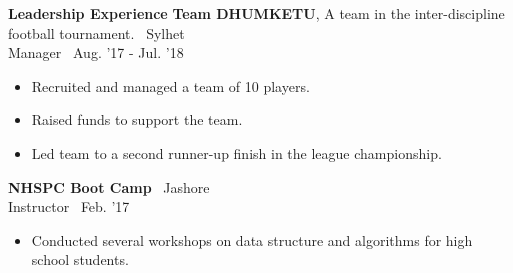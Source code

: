 \begin{rSection}{\textbf{Leadership Experience}}
{\bf Team DHUMKETU}{, A team in the inter-discipline football tournament.} \hfill {\ {Sylhet}}\\
Manager \hfill {\ Aug. '17 - Jul. '18} 
\begin{itemize}
  \item \vspace{-0.5em} Recruited and managed a team of 10 players.
  \vspace{-0.3em}
\end{itemize} 
\begin{itemize}
  \item \vspace{-0.5em} Raised funds to support the team.
  \vspace{-0.3em}
\end{itemize} 
\begin{itemize}
  \item \vspace{-0.5em} Led team to a second runner-up finish in the league championship.
  \vspace{-0.3em}
\end{itemize} 

{\bf NHSPC Boot Camp}{} \hfill {\ {Jashore}}\\
Instructor \hfill {\ Feb. '17} 
\begin{itemize}
  \item \vspace{-0.5em} Conducted several workshops on data structure and algorithms for high school students.
  \vspace{-0.3em}
\end{itemize} 
\end{rSection}